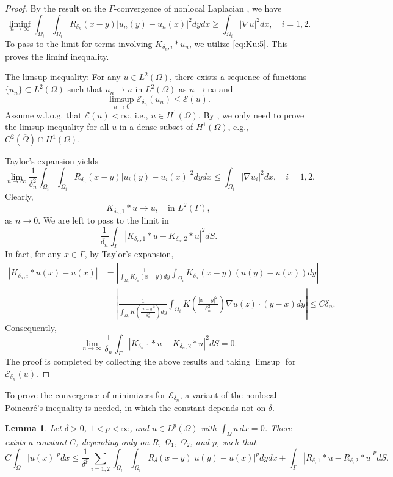 \documentclass{article}
\newtheorem{lemma}[theorem]{Lemma}
\theoremstyle{definition}
\begin{document}
\begin{proof}
  By the result on the $\Gamma$-convergence of nonlocal Laplacian \cite[Lemma 4.6]{slepcev2019analysis}, we have
  \[
  \liminf_{n\rightarrow \infty}
  \int_{\Omega_i}\int_{\Omega_i}R_{\delta_n}(x-y)|u_{n}(y)-u_{n}(x)|^2dydx
  \geq \int_{\Omega_i}|\nabla u|^2dx,\quad i=1,2.
  \]
  To pass to the limit for terms involving $K_{\delta_n,i}\ast{u}_{n}$, we utilize \eqref{eq:Ku:5}.
  This proves the liminf inequality.




The limsup inequality:
For any $u\in L^2(\Omega)$, there exists a sequence of functions $\{u_n\}\subset L^2(\Omega)$ such that $u_n\rightarrow u$ in $L^2(\Omega)$ as $n\rightarrow \infty$ and
  \[
    \limsup_{n\rightarrow 0} \mathcal{E}_{\delta_n}(u_n)\leq  \mathcal{E}(u).
  \]
Assume w.l.o.g. that $\mathcal{E}(u)<\infty$, i.e., $u\in H^1(\Omega)$. 
 By \cite[Remark 2.7]{garcia2016continuum},
  we only need to prove the limsup inequality for all $u$ in a dense subset of $H^1(\Omega)$, e.g., $C^2(\overline{\Omega})\cap H^1(\Omega)$.

  Taylor's expansion yields
  \[
  \lim_{n\rightarrow \infty}
  \frac{1}{\delta_n^2}\int_{\Omega_i}\int_{\Omega_i}R_{\delta_n}(x-y)|u_{i}(y)-u_{i}(x)|^2dydx
  \leq\int_{\Omega_i}|\nabla u_i|^2dx,\quad i=1,2.
  \]
  Clearly,
    \[
  K_{\delta_n,1}\ast{u}\rightarrow u ,\quad \mbox{in } L^2(\Gamma),
  \]
  as $n\rightarrow 0$.
  We are left to pass to the limit in 
  \[
  \frac{1}{\delta_n}
\int_\Gamma\left|K_{\delta_n,1}\ast u-K_{\delta_n,2}\ast u\right|^2dS.
  \]
  In fact, for any $x\in\Gamma$, by Taylor's expansion,
  \begin{align*}
    \left|K_{\delta_n,i}\ast u(x) -u(x)\right|
    &=\left|\frac{1}{\int_{\Omega_i}K_{\delta_n}(x-y)dy} \int_{\Omega_i}K_{\delta_n}(x-y)(u(y)-u(x))dy\right|\\
    &= 
    \left|\frac{1}{\int_{\Omega_i}K\left(\frac{|x-y|^2}{\delta_n^2}\right) dy} \int_{\Omega_i}K\left(\frac{|x-y|^2}{\delta_n^2}\right)
    \nabla u(z)\cdot (y-x)dy\right|
    \leq C \delta_n.
  \end{align*}
Consequently,
  \[
  \lim_{n\rightarrow \infty}\frac{1}{\delta_n}
\int_\Gamma\left|K_{\delta_n,1}\ast u-K_{\delta_n,2}\ast u\right|^2dS
=0.
  \]  
  The proof is completed by collecting the above results and taking $\limsup$ for $\mathcal{E}_{\delta_n} (u)$.
\end{proof}

To prove the convergence of minimizers for $\mathcal{E}_{\delta_n}$, a variant of the nonlocal Poincar\'{e}'s inequality is needed, in which the constant depends not on $\delta$.
\begin{lemma}\label{le:poincare_delta}
Let $\delta>0$, $1<p<\infty$, and $u\in L^p(\Omega)$ with $\int_\Omega u\,dx=0$.
There exists a constant $C$, depending only on $R$, $\Omega_1$, $\Omega_2$, and $p$, such that
\[
C\int_\Omega |u(x)|^pdx
\leq
 \frac{1}{\delta^p}\sum_{i=1,2}\int_{\Omega_i}\int_{\Omega_i}R_\delta(x-y)|u(y)-u(x)|^pdydx
 + \int_\Gamma |R_{\delta,1}\ast u-R_{\delta,2}\ast u|^pdS.
\]
\end{lemma}
\end{document}
